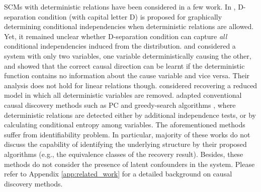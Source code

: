 \documentclass[12pt]{article}
\begin{document}
SCMs with deterministic relations have been considered in a few work. In \citep{geiger1990identifying, spirtes2000causation}, D-separation condition (with capital letter D)
is proposed for graphically determining conditional independencies when deterministic relations are allowed. Yet, it remained unclear whether D-separation condition can capture {\it{all}} conditional independencies induced from the distribution. \citet{daniusis2012inferring} and \citet{janzing2012information} considered a system with only two variables, one variable deterministically causing the other, and showed that the correct causal direction can be learnt if the deterministic function contains no information about the cause variable and vice versa.
Their analysis does not hold for linear relations though. \citet{scheines1996tetrad} considered recovering a reduced model in which all deterministic variables are removed. \citet{luo2006learning, mabrouk2014efficient, lemeire2012conservative} adapted conventional causal discovery methods such as PC and greedy-search algorithms \citep{pearl2009causality, tsamardinos2006max,chickering2002optimal}, where deterministic relations are detected either by additional independence tests, or by calculating conditional entropy among variables.
The aforementioned methods suffer from identifiability problem. 
In particular, majority of these works do not discuss the capability of identifying the underlying structure by their proposed algorithms (e.g., the equivalence classes of the recovery result).
Besides, these methods do not consider the presence of latent confounders in the system.
Please refer to Appendix \ref{app:related_work} for a detailed background on causal discovery methods.


\end{document}
